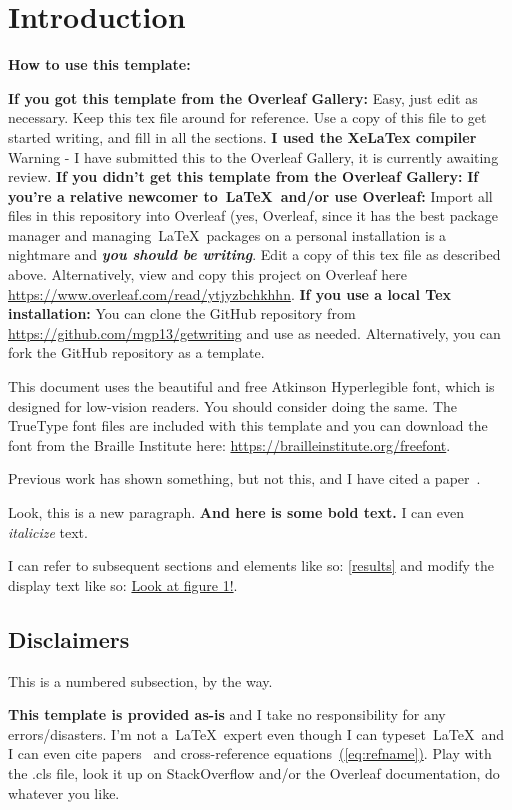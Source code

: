 \documentclass{getwriting}
\begin{document}
\section{Introduction}
\textbf{How to use this template: }
\begin{outline}[enumerate]
\1 \textbf{If you got this template from the Overleaf Gallery:}
Easy, just edit as necessary. Keep this tex file around for reference. Use a copy of this file to get started writing, and fill in all the sections. \textbf{I used the XeLaTex compiler} Warning - I have submitted this to the Overleaf Gallery, it is currently awaiting review. 
\1 \textbf{If you didn't get this template from the Overleaf Gallery:}
\2 \textbf{If you're a relative newcomer to~\LaTeX~and/or use Overleaf:}
Import all files in this repository into Overleaf (yes, Overleaf, since it has the best package manager and managing~\LaTeX~packages on a personal installation is a nightmare and \textit{\textbf{you should be writing}}. Edit a copy of this tex file as described above. Alternatively, view and copy this project on Overleaf here \url{https://www.overleaf.com/read/ytjyzbchkhhn}.
\2 \textbf{If you use a local Tex installation:}
You can clone the GitHub repository from \url{https://github.com/mgp13/getwriting} and use as needed. Alternatively, you can fork the GitHub repository as a template.
\end{outline}
\par
This document uses the beautiful and free Atkinson Hyperlegible font, which is designed for low-vision readers. You should consider doing the same. The TrueType font files are included with this template and you can download the font from the Braille Institute here: \url{https://brailleinstitute.org/freefont}.
\par
Previous work has shown something, but not this, and I have cited a paper~\cite{scbonita}. 
\par
Look, this is a new paragraph. \textbf{And here is some bold text.} I can even \textit{italicize} text.
\par
I can refer to subsequent sections and elements like so: \hyperref[results]{\autoref{results}} and modify the display text like so: \hyperref[fig:figure1]{Look at figure 1!}.
\par
\subsection{Disclaimers}
This is a numbered subsection, by the way.
\par
\textbf{This template is provided as-is} and I take no responsibility for any errors/disasters. I'm not a~\LaTeX~expert even though I can typeset~\LaTeX~and I can even cite papers~\cite{scbonita} and cross-reference equations~\hyperref[eq:refname]{(\autoref{eq:refname})}. Play with the .cls file, look it up on StackOverflow and/or the Overleaf documentation, do whatever you like.
\end{document}
